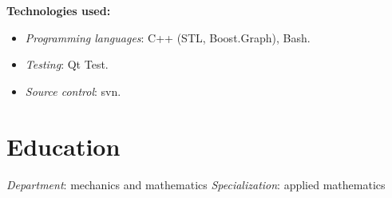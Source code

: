 \documentclass[11pt,a4paper]{moderncv}
\begin{document}
  \medskip
  \textbf{Technologies used:}
  \smallskip
  \begin{itemize}
    \item \textit{Programming languages}: C++ (STL, Boost.Graph), Bash.
    \item \textit{Testing}: Qt Test.
    \item \textit{Source control}: svn.
  \end{itemize}


\bigskip

\section{Education}
  {\medskip\textit{Department}: mechanics and mathematics}
  {\medskip\textit{Specialization}: applied mathematics}{}


\renewcommand{\listitemsymbol}{-~}
\end{document}

